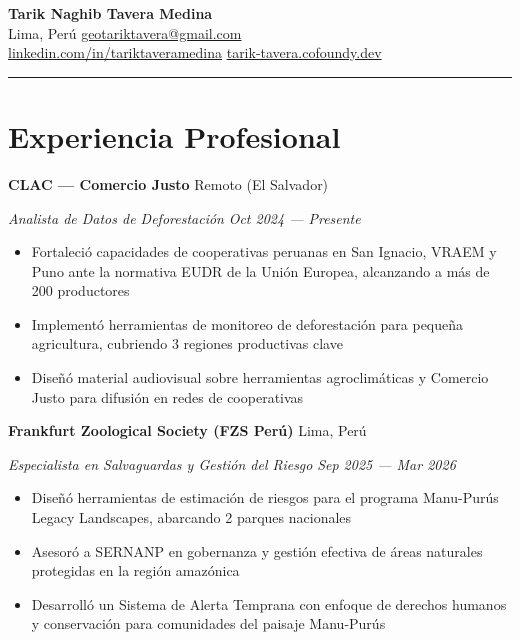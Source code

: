 \documentclass[11pt,letterpaper]{article}
\newcommand{\entry}[4]{%
  \noindent\textbf{#1} \hfill #2 \par\nopagebreak
  \textit{#3} \hfill \textit{#4} \par\nopagebreak
}
\begin{document}
\begin{center}
  {\LARGE\bfseries Tarik Naghib Tavera Medina} \\[4pt]
  \enspace Lima, Per\'u
  \quad{}\enspace \href{mailto:geotariktavera@gmail.com}{geotariktavera@gmail.com}
  \\[2pt]
  \enspace \href{https://www.linkedin.com/in/tariktaveramedina}{linkedin.com/in/tariktaveramedina}
  \quad{}\enspace \href{https://tarik-tavera.cofoundy.dev}{tarik-tavera.cofoundy.dev}
\end{center}

\vspace{-0.4em}
\noindent\rule{\textwidth}{0.8pt}
\vspace{-0.8em}

\section{Experiencia Profesional}

\entry{CLAC --- Comercio Justo}{Remoto (El Salvador)}{Analista de Datos de Deforestaci\'on}{Oct 2024 --- Presente}
\begin{itemize}
  \item Fortaleci\'o capacidades de cooperativas peruanas en San Ignacio, VRAEM y Puno ante la normativa EUDR de la Uni\'on Europea, alcanzando a m\'as de 200 productores
  \item Implement\'o herramientas de monitoreo de deforestaci\'on para peque\~na agricultura, cubriendo 3 regiones productivas clave
  \item Dise\~n\'o material audiovisual sobre herramientas agroclim\'aticas y Comercio Justo para difusi\'on en redes de cooperativas
\end{itemize}
\vspace{0.3em}

\entry{Frankfurt Zoological Society (FZS Per\'u)}{Lima, Per\'u}{Especialista en Salvaguardas y Gesti\'on del Riesgo}{Sep 2025 --- Mar 2026}
\begin{itemize}
  \item Dise\~n\'o herramientas de estimaci\'on de riesgos para el programa Manu-Pur\'us Legacy Landscapes, abarcando 2 parques nacionales
  \item Asesor\'o a SERNANP en gobernanza y gesti\'on efectiva de \'areas naturales protegidas en la regi\'on amaz\'onica
  \item Desarroll\'o un Sistema de Alerta Temprana con enfoque de derechos humanos y conservaci\'on para comunidades del paisaje Manu-Pur\'us
\end{itemize}
\vspace{0.3em}
\end{document}
